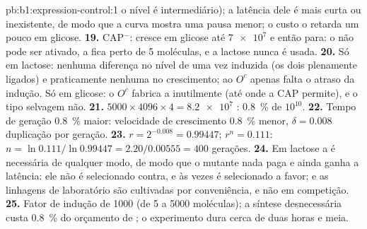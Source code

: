 \begin{solution}{pb:b1:expression-control:1}
o nível é intermediário); a latência dele é mais curta ou inexistente,
de modo que a curva mostra uma pausa menor; o custo o retarda um pouco
em glicose.
\textbf{19.} CAP$^-$: cresce em glicose até $\num{7e7}$ e então para: o
 não pode ser ativado, a  fica perto de 5 moléculas, e a
lactose nunca é usada.
\textbf{20.} Só em lactose: nenhuma diferença no nível de  uma vez
induzida (os dois plenamente ligados) e praticamente nenhuma no
crescimento; ao $O^c$ apenas falta o atraso da indução. Só em glicose: o
$O^c$ fabrica a  inutilmente (até onde a CAP permite), e o tipo
selvagem não.
\textbf{21.} $5000\times 4096\times 4 = \num{8.2e7}$ : \qty{0.8}{\%}
de $10^{10}$.
\textbf{22.} Tempo de geração \qty{0.8}{\%} maior: velocidade de
crescimento \qty{0.8}{\%} menor, $\delta = 0.008$ duplicação por
geração.
\textbf{23.} $r = 2^{-0.008} = 0.99447$; $r^n = 0.111$: $n =
\ln 0.111/\ln 0.99447 = 2.20/0.00555 = 400$ gerações.
\textbf{24.} Em lactose a  é necessária de qualquer modo, de modo
que o mutante nada paga e ainda ganha a latência: ele não é selecionado
contra, e às vezes é selecionado a favor; e as linhagens de laboratório
são cultivadas por conveniência, e não em competição.
\textbf{25.} Fator de indução de 1000 (de 5 a \num{5000} moléculas); a
síntese desnecessária custa \qty{0.8}{\%} do orçamento de ; o
experimento dura cerca de duas horas e meia.
\end{solution}
